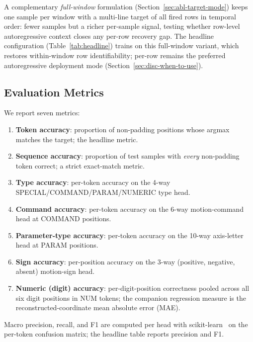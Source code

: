 \documentclass[sensors,article,submit,moreauthors,pdftex]{Definitions/mdpi}
\begin{document}
A complementary \emph{full-window} formulation (Section~\ref{sec:abl-target-mode}) keeps one sample per window with a multi-line target of all fired rows in temporal order: fewer samples but a richer per-sample signal, testing whether row-level autoregressive context closes any per-row recovery gap. The headline configuration (Table~\ref{tab:headline}) trains on this full-window variant, which restores within-window row identifiability; per-row remains the preferred autoregressive deployment mode (Section~\ref{sec:disc-when-to-use}).

\subsection{Evaluation Metrics}
\label{sec:metrics}

We report seven metrics:

\begin{enumerate}
\item \textbf{Token accuracy}: proportion of non-padding positions whose argmax matches the target; the headline metric.
\item \textbf{Sequence accuracy}: proportion of test samples with \emph{every} non-padding token correct; a strict exact-match metric.
\item \textbf{Type accuracy}: per-token accuracy on the 4-way SPECIAL/COMMAND/PARAM/NUMERIC type head.
\item \textbf{Command accuracy}: per-token accuracy on the 6-way motion-command head at COMMAND positions.
\item \textbf{Parameter-type accuracy}: per-token accuracy on the 10-way axis-letter head at PARAM positions.
\item \textbf{Sign accuracy}: per-position accuracy on the 3-way (positive, negative, absent) motion-sign head.
\item \textbf{Numeric (digit) accuracy}: per-digit-position correctness pooled across all six digit positions in NUM tokens; the companion regression measure is the reconstructed-coordinate mean absolute error (MAE).
\end{enumerate}

Macro precision, recall, and F1 are computed per head with scikit-learn~\cite{pedregosa2011sklearn} on the per-token confusion matrix; the headline table reports precision and F1.
\end{document}
